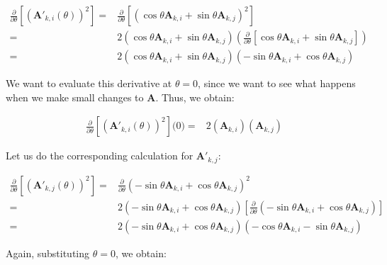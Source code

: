 \documentclass[11pt, oneside]{amsart}
\newcommand{\fpartial}[2]{\frac{\partial #1}{\partial #2}}
\newcommand{\mtx}[1]{\bm{#1}}
\newcommand{\fptheta}{\fpartial{}{\theta}}
\newcommand{\mtxA}{\mtx{A}}
\begin{document}
\begin{equation*}
  \begin{split}
    \fptheta \left[ \left( \mtxA'_{k, i}(\theta) \right)^2 \right]
      ={}& \fptheta \left[\left(
          \cos\theta \mtxA_{k, i} + \sin\theta \mtxA_{k, j}
        \right)^2\right] \\
      ={}& 2 \left(
          \cos\theta \mtxA_{k, i} + \sin\theta \mtxA_{k, j}
        \right) \left( \fptheta \left[
          \cos\theta \mtxA_{k, i} + \sin\theta \mtxA_{k, j}
        \right] \right) \\
      ={}& 2 \left(
        \cos\theta \mtxA_{k, i} + \sin\theta \mtxA_{k, j}
      \right) \left(
        -\sin\theta \mtxA_{k, i} + \cos\theta \mtxA_{k, j}
      \right)
  \end{split}
\end{equation*}

We want to evaluate this derivative at $\theta = 0$, since we want to
see what happens when we make small changes to $\mtxA$. Thus, we obtain:

\begin{equation*}
  \begin{split}
    \fptheta \left[ \left( \mtxA'_{k, i}(\theta) \right)^2 \right] \big(0\big)
      ={}&
        2
        \left( \mtxA_{k, i} \right)
        \left( \mtxA_{k, j} \right)
  \end{split}
\end{equation*}

Let us do the corresponding calculation for $\mtxA'_{k, j}$:

\begin{equation*}
  \begin{split}
    \fptheta \left[ \left( \mtxA'_{k, j}(\theta) \right)^2 \right]
      ={}& \fptheta \left(
          -\sin\theta \mtxA_{k, i} + \cos\theta \mtxA_{k, j}
        \right)^2 \\
      ={}& 2 \left(
          -\sin\theta \mtxA_{k, i} + \cos\theta \mtxA_{k, j}
        \right) \left[ \fptheta \left(
          -\sin\theta \mtxA_{k, i} + \cos\theta \mtxA_{k, j}
        \right) \right] \\
      ={}& 2 \left(
        -\sin\theta \mtxA_{k, i} + \cos\theta \mtxA_{k, j}
      \right) \left(
        -\cos\theta \mtxA_{k, i} - \sin\theta \mtxA_{k, j}
      \right)
  \end{split}
\end{equation*}

Again, substituting $\theta = 0$, we obtain:
\end{document}
